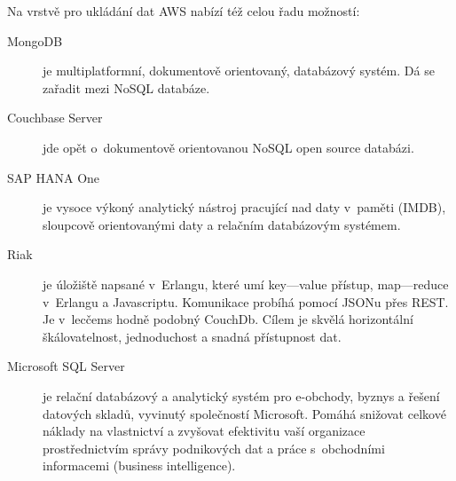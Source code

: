Na vrstvě pro ukládání dat AWS nabízí též celou řadu možností:
\begin{description}
	\item [MongoDB] je multiplatformní, dokumentově orientovaný, databázový systém. Dá se zařadit mezi NoSQL databáze.
	\item [Couchbase Server] jde opět o~dokumentově orientovanou NoSQL open source databázi.
	\item [SAP HANA One] je vysoce výkoný analytický nástroj pracující nad daty v~paměti (IMDB), sloupcově orientovanými daty a relačním databázovým systémem.
	\item [Riak] je úložiště napsané v~Erlangu, které umí key---value přístup, map---reduce v~Erlangu a Javascriptu. Komunikace probíhá pomocí JSONu přes REST. Je v~lecčems hodně podobný CouchDb. Cílem je skvělá horizontální škálovatelnost, jednoduchost a snadná přístupnost dat.\cite{knesl:riak}
	\item [Microsoft SQL Server] je relační databázový a analytický systém pro e-obchody, byznys a řešení datových skladů, vyvinutý společností Microsoft. Pomáhá snižovat celkové náklady na vlastnictví a zvyšovat efektivitu vaší organizace prostřednictvím správy podnikových dat a práce s~obchodními informacemi (business intelligence).\cite{wiki:mssql}
\end{description}

